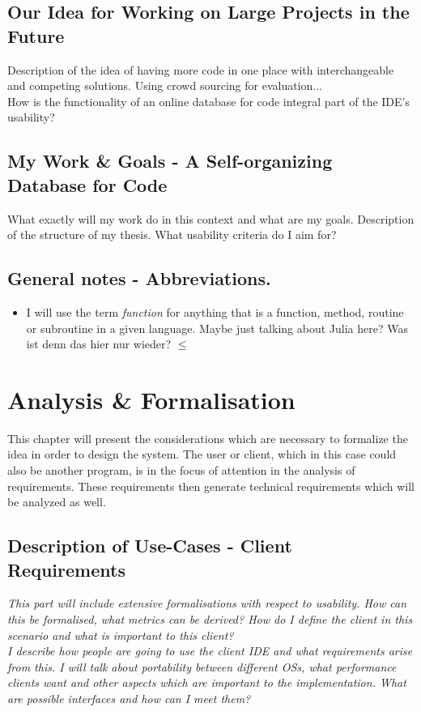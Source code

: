 \documentclass[twoside, 11pt]{scrartcl}
\begin{document}
\subsection{Our Idea for Working on Large Projects in the Future}
Description of the idea of having more code in one place with interchangeable and competing solutions. Using crowd sourcing for evaluation...\\
How is the functionality of an online database for code integral part of the IDE's usability?\\

\subsection{My Work \& Goals - A Self-organizing Database for Code}
What exactly will my work do in this context and what are my goals. 
Description of the structure of my thesis. What usability criteria do I aim for?\\

\subsection*{General notes - Abbreviations.}
\begin{itemize}
	\item I will use the term \textit{function} for anything that is a function, method, routine or subroutine in a given language. Maybe just talking about Julia here?
	Was ist denn das hier nur wieder? $\leq$
\end{itemize}



\section{Analysis \& Formalisation}
\label{sec:analysis}
This chapter will present the considerations which are necessary to formalize the idea in order to design the system. The user or client, which in this case could also be another program,  is in the focus of attention in the analysis of requirements. These requirements then generate technical requirements which will be analyzed as well.

\subsection{Description of Use-Cases - Client Requirements}
\label{sec:clientReq}
\textit{This part will include extensive formalisations with respect to usability. How can this be formalised, what metrics can be derived? How do I define the client in this scenario and what is important to this client?\\
I describe how people are going to use the client IDE and what requirements arise from this. I will talk about portability between different OSs, what performance clients want and other aspects which are important to the implementation. What are possible interfaces and how can I meet them?}
\end{document}
